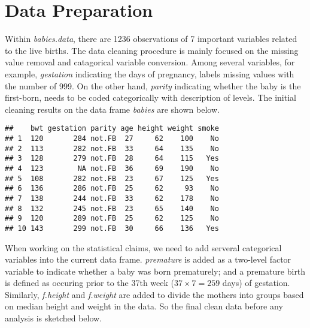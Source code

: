 \documentclass{article}\usepackage{graphicx, color}
\makeatletter
\newenvironment{kframe}{%
 \def\at@end@of@kframe{}%
 \ifinner\ifhmode%
  \def\at@end@of@kframe{\end{minipage}}%
  \begin{minipage}{\columnwidth}%
 \fi\fi%
 \def\FrameCommand##1{\hskip\@totalleftmargin \hskip-\fboxsep
 \colorbox{shadecolor}{##1}\hskip-\fboxsep
     \hskip-\linewidth \hskip-\@totalleftmargin \hskip\columnwidth}%
 \MakeFramed {\advance\hsize-\width
   \@totalleftmargin\z@ \linewidth\hsize
   \@setminipage}}%
 {\par\unskip\endMakeFramed%
 \at@end@of@kframe}
\newenvironment{knitrout}{}{} %
\makeatother
\begin{document}
\section*{Data Preparation}

\hspace{12 pt} Within \textit{babies.data}, there are 1236 observations of 7 
important variables related to the live births.
The data cleaning procedure is mainly focused on the missing value
removal and catagorical variable conversion. 
Among several variables, for example, \textit{gestation} indicating the days
of pregnancy, labels missing values with the number of 999. On the other hand,
\textit{parity} indicating whether the baby is the first-born, needs
to be coded categorically with description of levels. 
The initial cleaning results on the data frame \textit{babies} are
shown below.


\begin{knitrout}
\color{fgcolor}\begin{kframe}
\begin{verbatim}
##    bwt gestation parity age height weight smoke
## 1  120       284 not.FB  27     62    100    No
## 2  113       282 not.FB  33     64    135    No
## 3  128       279 not.FB  28     64    115   Yes
## 4  123        NA not.FB  36     69    190    No
## 5  108       282 not.FB  23     67    125   Yes
## 6  136       286 not.FB  25     62     93    No
## 7  138       244 not.FB  33     62    178    No
## 8  132       245 not.FB  23     65    140    No
## 9  120       289 not.FB  25     62    125    No
## 10 143       299 not.FB  30     66    136   Yes
\end{verbatim}
\end{kframe}
\end{knitrout}


When working on the statistical claims, we need to add serveral categorical
variables into the current data frame.
\textit{premature} is added as a two-level factor variable to indicate
whether a baby was born prematurely; and a premature birth is defined
as occuring prior to the 37th week ($37\times 7 = 259$ days) of
gestation. Similarly, \textit{f.height} and \textit{f.weight} are
added to divide the mothers into groups based on median height and
weight in the data. So the final clean data before any analysis is
sketched below.
\end{document}
